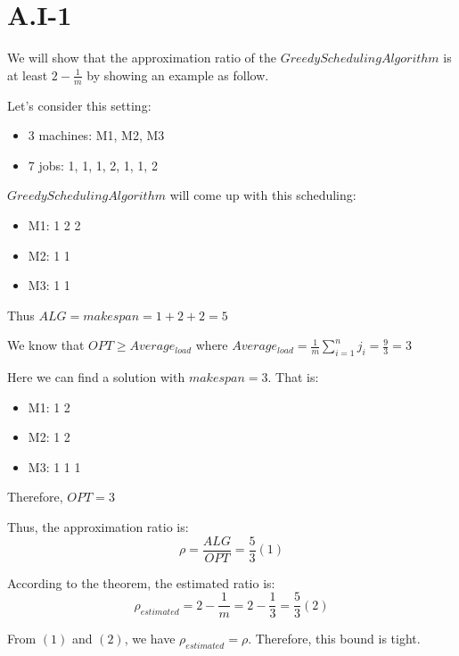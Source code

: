 \section{A.I-1}
\label{a-1-1)}

We will show that the approximation ratio of the $Greedy Scheduling Algorithm$ is at least $2 - \frac{1}{m}$ by showing an example as follow.

Let's consider this setting:

\begin{itemize}
    \item 3 machines: M1, M2, M3
    \item 7 jobs: 1, 1, 1, 2, 1, 1, 2
  \end{itemize}

$Greedy Scheduling Algorithm$ will come up with this scheduling:

\begin{itemize}
\item M1: 1 2 2
\item M2: 1 1
\item M3: 1 1
\end{itemize}

Thus $ALG = makespan = 1 + 2 + 2 = 5$

We know that $OPT \geq Average_{load}$ where $Average_{load} = \frac{1}{m} \sum_{i=1}^{n} j_i = \frac{9}{3} = 3$

Here we can find a solution with $makespan = 3$. That is:
\begin{itemize}
\item M1: 1 2
\item M2: 1 2
\item M3: 1 1 1
\end{itemize}

Therefore, $OPT = 3$

Thus, the approximation ratio is:
\begin{equation}
  \rho = \frac{ALG}{OPT} = \frac{5}{3} (1)
\end{equation}

According to the theorem, the estimated ratio is:
\begin{equation}
  \rho_{estimated} = 2 - \frac{1}{m} = 2 - \frac{1}{3} = \frac{5}{3} (2)
\end{equation}

From $(1)$ and $(2)$, we have $\rho_{estimated} = \rho$. Therefore, this bound is tight.
